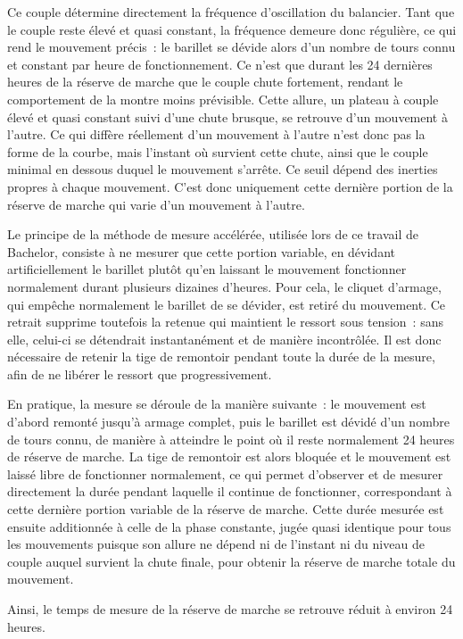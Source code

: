 Ce couple détermine directement la fréquence d'oscillation du balancier. Tant que le couple reste élevé et quasi constant, la fréquence demeure donc régulière, ce qui rend le mouvement précis~: le barillet se dévide alors d'un nombre de tours connu et constant par heure de fonctionnement. Ce n'est que durant les 24 dernières heures de la réserve de marche que le couple chute fortement, rendant le comportement de la montre moins prévisible. Cette allure, un plateau à couple élevé et quasi constant suivi d'une chute brusque, se retrouve d'un mouvement à l'autre. Ce qui diffère réellement d'un mouvement à l'autre n'est donc pas la forme de la courbe, mais l'instant où survient cette chute, ainsi que le couple minimal en dessous duquel le mouvement s'arrête. Ce seuil dépend des inerties propres à chaque mouvement. C'est donc uniquement cette dernière portion de la réserve de marche qui varie d'un mouvement à l'autre.

Le principe de la méthode de mesure accélérée, utilisée lors de ce travail de Bachelor, consiste à ne mesurer que cette portion variable, en dévidant artificiellement le barillet plutôt qu'en laissant le mouvement fonctionner normalement durant plusieurs dizaines d'heures. Pour cela, le cliquet d'armage, qui empêche normalement le barillet de se dévider, est retiré du mouvement. Ce retrait supprime toutefois la retenue qui maintient le ressort sous tension~: sans elle, celui-ci se détendrait instantanément et de manière incontrôlée. Il est donc nécessaire de retenir la tige de remontoir pendant toute la durée de la mesure, afin de ne libérer le ressort que progressivement.

En pratique, la mesure se déroule de la manière suivante~: le mouvement est d'abord remonté jusqu'à armage complet, puis le barillet est dévidé d'un nombre de tours connu, de manière à atteindre le point où il reste normalement 24 heures de réserve de marche. La tige de remontoir est alors bloquée et le mouvement est laissé libre de fonctionner normalement, ce qui permet d'observer et de mesurer directement la durée pendant laquelle il continue de fonctionner, correspondant à cette dernière portion variable de la réserve de marche. Cette durée mesurée est ensuite additionnée à celle de la phase constante, jugée quasi identique pour tous les mouvements puisque son allure ne dépend ni de l'instant ni du niveau de couple auquel survient la chute finale, pour obtenir la réserve de marche totale du mouvement.

Ainsi, le temps de mesure de la réserve de marche se retrouve réduit à environ 24 heures.
